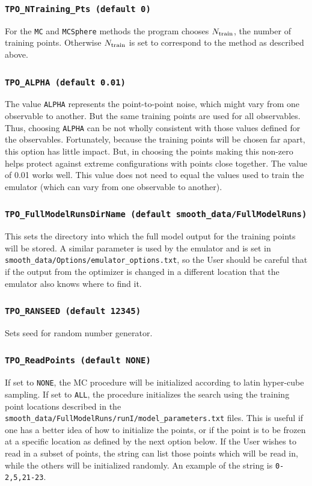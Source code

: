 \documentclass[UserManual.tex]{subfiles}
\begin{document}
\begin{sloppypar}
\subsubsection{{\tt TPO\_NTraining\_Pts (default 0)}}
For the {\tt MC} and {\tt MCSphere} methods the program chooses $N_{\rm train}$, the number of training points. Otherwise $N_{\rm train}$ is set to correspond to the method as described above.

\subsubsection{{\tt TPO\_ALPHA (default 0.01)}}
The value {\tt ALPHA} represents the point-to-point noise, which might vary from one observable to another. But the same training points are used for all observables. Thus, choosing {\tt ALPHA} can be not wholly consistent with those values defined for the observables. Fortunately, because the training points will be chosen far apart, this option has little impact. But, in choosing the points making this non-zero helps protect against extreme configurations with points close together. The value of 0.01 works well. This value does not need to equal the values used to train the emulator (which can vary from one observable to another).

\subsubsection{{\tt TPO\_FullModelRunsDirName (default smooth\_data/FullModelRuns)}}
This sets the directory into which the full model output for the training points will be stored. A similar parameter is used by the emulator and is set in {\tt smooth\_data/Options/emulator\_options.txt}, so the User should be careful that if the output from the optimizer is changed in a different location that the emulator also knows where to find it.

\subsubsection{{\tt TPO\_RANSEED (default 12345)}}
Sets seed for random number generator.

\subsubsection{{\tt TPO\_ReadPoints (default NONE)}}
If set to {\tt NONE}, the MC procedure will be initialized according to latin hyper-cube sampling. If set to {\tt ALL}, the procedure initializes the search using the training point locations described in the {\tt smooth\_data/FullModelRuns/runI/model\_parameters.txt} files. This is useful if one has a better idea of how to initialize the points, or if the point is to be frozen at a specific location as defined by the next option below. If the User wishes to read in a subset of points, the string can list those points which will be read in, while the others will be initialized randomly. An example of the string is {\tt 0-2,5,21-23}.


\end{sloppypar}
\end{document}

